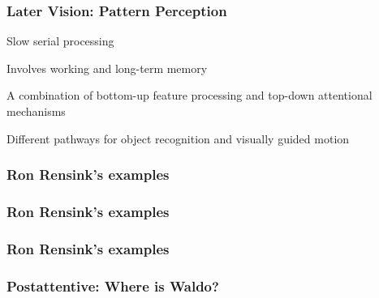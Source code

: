 \documentclass[12pt]{beamer}\usepackage[]{graphicx}\usepackage[]{color}
\begin{document}

\begin{frame}
\frametitle{Later Vision: Pattern Perception}

\bbi
  \item Slow serial processing
  \item Involves working and long-term memory
  \item A combination of bottom-up feature processing and top-down attentional
  mechanisms
  \item Different pathways for object recognition and visually guided motion
\ei

\end{frame}


\begin{frame}
\frametitle{Ron Rensink's examples}
\begin{center}
\end{center}
\end{frame}


\begin{frame}
\frametitle{Ron Rensink's examples}
\begin{center}
\end{center}
\end{frame}


\begin{frame}
\frametitle{Ron Rensink's examples}
\begin{center}
\end{center}
\end{frame}


\begin{frame}
\frametitle{Postattentive: Where is Waldo?}
\begin{center}
\end{center}
\end{frame}

\end{document}
